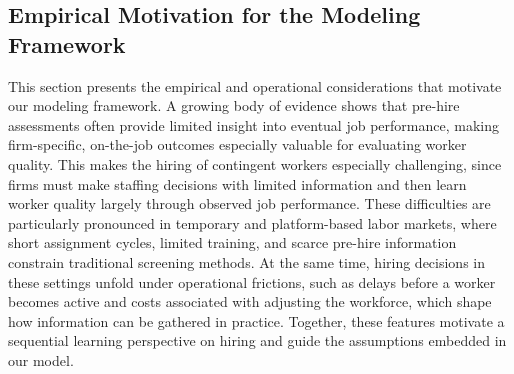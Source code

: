 \documentclass[opre,blindrev]{informs3}
\begin{document}
\vspace{-.1in}

\subsection{Empirical Motivation for the Modeling Framework}\label{sec:hiring-background}
This section presents the empirical and operational considerations that motivate our modeling framework. A growing body of evidence shows that pre-hire assessments often provide limited insight into eventual job performance, making firm-specific, on-the-job outcomes especially valuable for evaluating worker quality. This makes the hiring of contingent workers especially challenging, since firms must make staffing decisions with limited information and then learn worker quality largely through observed job performance. These difficulties are particularly pronounced in temporary and platform-based labor markets, where short assignment cycles, limited training, and scarce pre-hire information constrain traditional screening methods. At the same time, hiring decisions in these settings unfold under operational frictions, such as delays before a worker becomes active and costs associated with adjusting the workforce, which shape how information can be gathered in practice. Together, these features motivate a sequential learning perspective on hiring and guide the assumptions embedded in our model.
\end{document}
